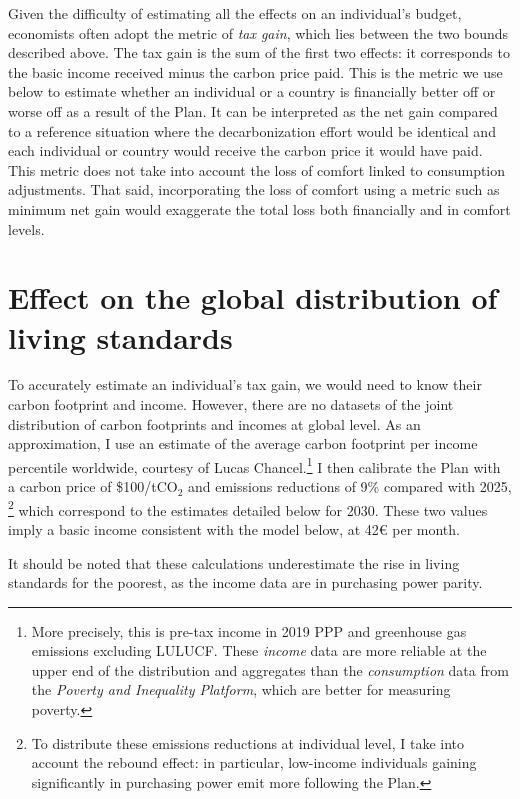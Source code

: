 \documentclass[a5paper,english,openany]{memoir}
\begin{document}
Given the difficulty of estimating all the effects on an individual's budget, economists often adopt the metric of \textit{tax gain}, which lies between the two bounds described above. The tax gain is the sum of the first two effects: it corresponds to the basic income received minus the carbon price paid. This is the metric we use below to estimate whether an individual or a country is financially better off or worse off as a result of the Plan. It can be interpreted as the net gain compared to a reference situation where the decarbonization effort would be identical and each individual or country would receive the carbon price it would have paid. This metric does not take into account the loss of comfort linked to consumption adjustments. That said, incorporating the loss of comfort using a metric such as minimum net gain would exaggerate the total loss both financially and in comfort levels. %

\section{Effect on the global distribution of living standards}\label{app:revenus}

To accurately estimate an individual's tax gain, we would need to know their %
carbon footprint and income. However, there are no datasets of the joint distribution of carbon footprints and incomes at global level. As an approximation, I use an estimate of the average carbon footprint per income percentile worldwide, courtesy of Lucas Chancel.\footnote{More precisely, this is pre-tax income in 2019 PPP \textit{\texteuro{}} and greenhouse gas emissions excluding LULUCF. These \textit{income} data are more reliable at the upper end of the distribution and aggregates than the \textit{consumption} data from the \textit{Poverty and Inequality Platform}, which are better for measuring poverty.} I then calibrate the Plan with a carbon price of \$100/tCO$_\text{2}$ and emissions reductions of 9\% compared with 2025,%
\footnote{To distribute these emissions reductions at individual level, I take into account the rebound effect: in particular, low-income individuals gaining significantly in purchasing power emit more following the Plan.} which correspond to the estimates detailed below for 2030. These two values imply a basic income consistent with the model below, at 42\euro{} per month. %

It should be noted that these calculations underestimate the rise in living standards for the poorest, as the income data are in purchasing power parity.
\end{document}
